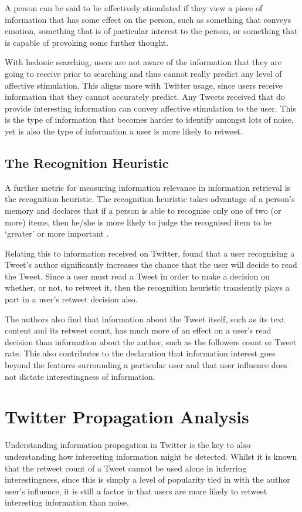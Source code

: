 A person can be said to be affectively stimulated if they view a piece of information that has some effect on the person, such as something that conveys emotion, something that is of particular interest to the person, or something that is capable of provoking some further thought.

With hedonic searching, users are not aware of the information that they are going to receive prior to searching and thus cannot really predict any level of affective stimulation. This aligns more with Twitter usage, since users receive information that they cannot accurately predict. Any Tweets received that do provide interesting information can convey affective stimulation to the user. This is the type of information that becomes harder to identify amongst lots of noise, yet is also the type of information a user is more likely to retweet.


\subsection{The Recognition Heuristic} 
A further metric for measuring information relevance in information retrieval is the recognition heuristic. The recognition heuristic takes advantage of a person's memory and declares that if a person is able to recognise only one of two (or more) items, then he/she is more likely to judge the recognised item to be `greater' or more important \cite{oppenheimer03} \cite{goldstein99}.

Relating this to information received on Twitter, \cite{chorley12} found that a user recognising a Tweet's author significantly increases the chance that the user will decide to read the Tweet. Since a user must read a Tweet in order to make a decision on whether, or not, to retweet it, then the recognition heuristic transiently plays a part in a user's retweet decision also.

The authors also find that information about the Tweet itself, such as its text content and its retweet count, has much more of an effect on a user's read decision than information about the author, such as the followers count or Tweet rate. This also contributes to the declaration that information interest goes beyond the features surrounding a particular user and that user influence does not dictate interestingness of information.


\section{Twitter Propagation Analysis}
Understanding information propagation in Twitter is the key to also understanding how interesting information might be detected. Whilst it is known that the retweet count of a Tweet cannot be used alone in inferring interestingness, since this is simply a level of popularity tied in with the author user's influence, it is still a factor in that users are more likely to retweet interesting information than noise.

